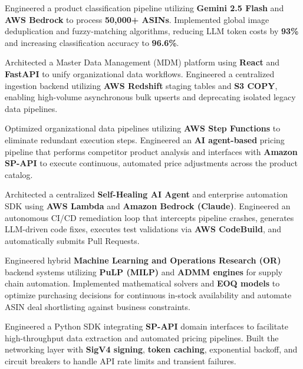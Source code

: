 \documentclass[letterpaper,10pt]{article}
\begin{document}
\begin{resume_list}
    \item{Engineered a product classification pipeline utilizing \textbf{Gemini 2.5 Flash} and \textbf{AWS Bedrock} to process \textbf{50,000+ ASINs}. Implemented global image deduplication and fuzzy-matching algorithms, reducing LLM token costs by \textbf{93\%} and increasing classification accuracy to \textbf{96.6\%}.}
    \item{Architected a Master Data Management (MDM) platform using \textbf{React} and \textbf{FastAPI} to unify organizational data workflows. Engineered a centralized ingestion backend utilizing \textbf{AWS Redshift} staging tables and \textbf{S3 COPY}, enabling high-volume asynchronous bulk upserts and deprecating isolated legacy data pipelines.}
    \item{Optimized organizational data pipelines utilizing \textbf{AWS Step Functions} to eliminate redundant execution steps. Engineered an \textbf{AI agent-based} pricing pipeline that performs competitor product analysis and interfaces with \textbf{Amazon SP-API} to execute continuous, automated price adjustments across the product catalog.}
    \item{Architected a centralized \textbf{Self-Healing AI Agent} and enterprise automation SDK using \textbf{AWS Lambda} and \textbf{Amazon Bedrock (Claude)}. Engineered an autonomous CI/CD remediation loop that intercepts pipeline crashes, generates LLM-driven code fixes, executes test validations via \textbf{AWS CodeBuild}, and automatically submits Pull Requests.}
    \item{Engineered hybrid \textbf{Machine Learning and Operations Research (OR)} backend systems utilizing \textbf{PuLP (MILP)} and \textbf{ADMM engines} for supply chain automation. Implemented mathematical solvers and \textbf{EOQ models} to optimize purchasing decisions for continuous in-stock availability and automate ASIN deal shortlisting against business constraints.}
    \item{Engineered a Python SDK integrating \textbf{SP-API} domain interfaces to facilitate high-throughput data extraction and automated pricing pipelines. Built the networking layer with \textbf{SigV4 signing}, \textbf{token caching}, exponential backoff, and circuit breakers to handle API rate limits and transient failures.}
\end{resume_list}
\end{document}
